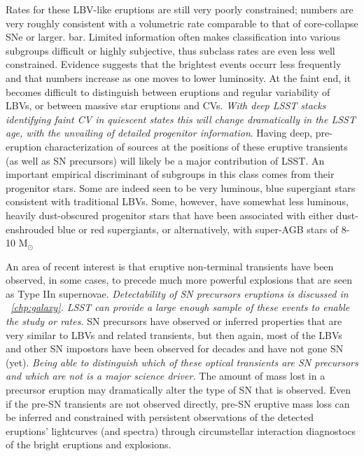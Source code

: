 Rates for these LBV-like eruptions are still very poorly constrained;
numbers are very roughly consistent with a volumetric rate comparable
to that of core-collapse SNe or larger.  %
bar.  Limited information often makes classification into various
subgroups difficult or highly subjective, thus subclass rates are even
less well constrained.  %
Evidence suggests that the brightest events occurr less frequently and that
numbers increase as one moves to lower luminosity.  At the faint end,
it becomes difficult to distinguish between eruptions and regular
variability of LBVs, or between massive star eruptions and CVs.  \emph{With
deep LSST stacks identifying faint CV in quiescent states this will
 change dramatically in the LSST age, with the unvailing of
detailed progenitor information}.  Having deep, pre-eruption
characterization of sources at the positions of these eruptive
transients (as well as SN precursors) will likely be a major
contribution of LSST.
An important empirical discriminant of subgroups in this class comes
from their progenitor stars.  Some are indeed seen to be very
luminous, blue supergiant stars consistent with traditional LBVs.
Some, however, have somewhat less luminous, heavily dust-obscured
progenitor stars that have been associated with either dust-enshrouded
blue or red supergiants, or alternatively, with super-AGB stars of
8-10 M$_{\odot}$%


An area of recent interest is that eruptive non-terminal transients
have been observed, in some cases, to precede much more powerful
explosions that are seen as Type IIn supernovae.  \emph{Detectability of SN
precursors eruptions is discussed in ~\autoref{chp:galaxy}.
LSST can provide a large enough sample of these events to enable the study
or rates.} %
SN
precursors have observed or inferred properties that are very similar
to LBVs and related transients,
but then again, most of the LBVs and other SN impostors have been
observed for decades and have not gone SN (yet).  \emph{Being able to
  distinguish which of these optical transients are SN precursors and
  which are not is a major science driver.}  The amount of mass lost
in a precursor eruption may dramatically alter the type of SN that is
observed.  Even if the pre-SN transients are not observed directly,
pre-SN eruptive mass loss can be inferred and constrained with
persistent observations of the detected eruptions' lightcurves (and
spectra) through circumstellar interaction diagnostocs of
the bright eruptions and explosions. 


